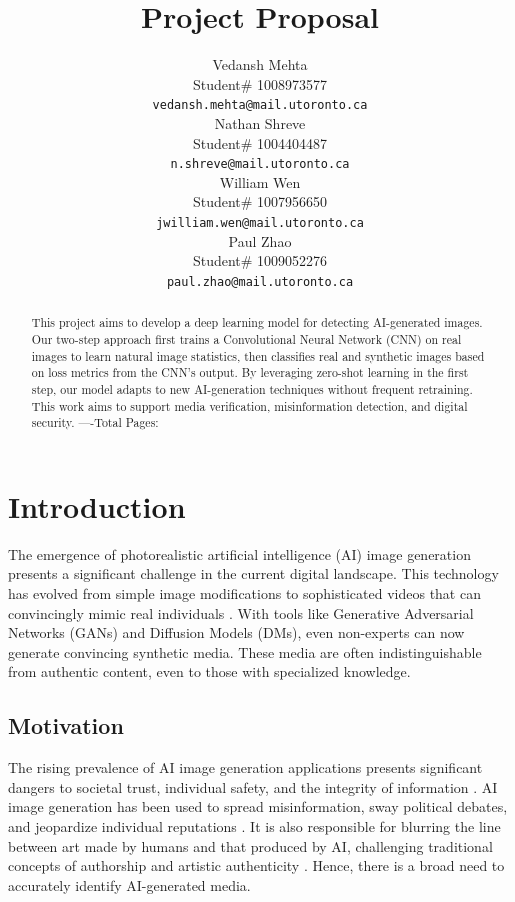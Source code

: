 \documentclass{article} %
\title{Project Proposal}
\author{Vedansh Mehta  \\
Student\# 1008973577 \\
\texttt{vedansh.mehta@mail.utoronto.ca} \\
\And
Nathan Shreve  \\
Student\# 1004404487 \\
\texttt{n.shreve@mail.utoronto.ca} \\
\AND
William Wen  \\
Student\# 1007956650 \\
\texttt{jwilliam.wen@mail.utoronto.ca} \\
\And
Paul Zhao \\
Student\# 1009052276 \\
\texttt{paul.zhao@mail.utoronto.ca} \\
\AND
}
\begin{document}
\maketitle

\begin{abstract}
This project aims to develop a deep learning model for detecting AI-generated images. Our two-step approach first trains a Convolutional Neural Network (CNN) on real images to learn natural image statistics, then classifies real and synthetic images based on loss metrics from the CNN's output. By leveraging zero-shot learning in the first step, our model adapts to new AI-generation techniques without frequent retraining. This work aims to support media verification, misinformation detection, and digital security.
----Total Pages: \pageref{last_page}
\end{abstract}



\section{Introduction}
\label{intro}

The emergence of photorealistic artificial intelligence (AI) image generation presents a significant challenge in the current digital landscape. This technology has evolved from simple image modifications to sophisticated videos that can convincingly mimic real individuals \citep{cnn2025}. With tools like Generative Adversarial Networks (GANs) and Diffusion Models (DMs), even non-experts can now generate convincing synthetic media. These media are often indistinguishable from authentic content, even to those with specialized knowledge.

\subsection{Motivation}
The rising prevalence of AI image generation applications presents significant dangers to societal trust, individual safety, and the integrity of information \citep{epstein2023generative}. AI image generation has been used to spread misinformation, sway political debates, and jeopardize individual reputations \citep{chesney2019}. It is also responsible for blurring the line between art made by humans and that produced by AI, challenging traditional concepts of authorship and artistic authenticity \citep{Dipascalido2023}. Hence, there is a broad need to accurately identify AI-generated media.
\end{document}
